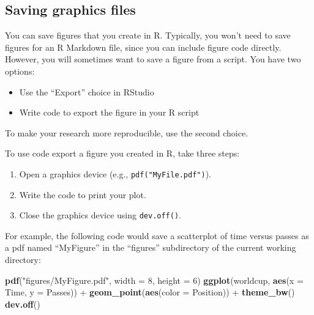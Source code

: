\documentclass[]{book}
\makeatletter
\newenvironment{Shaded}{\begin{snugshade}}{\end{snugshade}}
\newcommand{\KeywordTok}[1]{\textcolor[rgb]{0.13,0.29,0.53}{\textbf{{#1}}}}
\newcommand{\DataTypeTok}[1]{\textcolor[rgb]{0.13,0.29,0.53}{{#1}}}
\newcommand{\DecValTok}[1]{\textcolor[rgb]{0.00,0.00,0.81}{{#1}}}
\newcommand{\StringTok}[1]{\textcolor[rgb]{0.31,0.60,0.02}{{#1}}}
\newcommand{\NormalTok}[1]{{#1}}
\providecommand{\tightlist}{%
  \setlength{\itemsep}{0pt}\setlength{\parskip}{0pt}}
\newenvironment{kframe}{%
\medskip{}
\setlength{\fboxsep}{.8em}
 \def\at@end@of@kframe{}%
 \ifinner\ifhmode%
  \def\at@end@of@kframe{\end{minipage}}%
  \begin{minipage}{\columnwidth}%
 \fi\fi%
 \def\FrameCommand##1{\hskip\@totalleftmargin \hskip-\fboxsep
 \colorbox{shadecolor}{##1}\hskip-\fboxsep
     \hskip-\linewidth \hskip-\@totalleftmargin \hskip\columnwidth}%
 \MakeFramed {\advance\hsize-\width
   \@totalleftmargin\z@ \linewidth\hsize
   \@setminipage}}%
 {\par\unskip\endMakeFramed%
 \at@end@of@kframe}
\renewenvironment{Shaded}{\begin{kframe}}{\end{kframe}}
\makeatother
\begin{document}
\subsection{Saving graphics files}\label{saving-graphics-files}

You can save figures that you create in R. Typically, you won't need to
save figures for an R Markdown file, since you can include figure code
directly. However, you will sometimes want to save a figure from a
script. You have two options:

\begin{itemize}
\tightlist
\item
  Use the ``Export'' choice in RStudio
\item
  Write code to export the figure in your R script
\end{itemize}

To make your research more reproducible, use the second choice.

To use code export a figure you created in R, take three steps:

\begin{enumerate}
\def\labelenumi{\arabic{enumi}.}
\tightlist
\item
  Open a graphics device (e.g., \texttt{pdf("MyFile.pdf")}).
\item
  Write the code to print your plot.
\item
  Close the graphics device using \texttt{dev.off()}.
\end{enumerate}

For example, the following code would save a scatterplot of time versus
passes as a pdf named ``MyFigure'' in the ``figures'' subdirectory of
the current working directory:

\begin{Shaded}
\begin{Highlighting}[]
\KeywordTok{pdf}\NormalTok{(}\StringTok{"figures/MyFigure.pdf"}\NormalTok{, }\DataTypeTok{width =} \DecValTok{8}\NormalTok{, }\DataTypeTok{height =} \DecValTok{6}\NormalTok{)}
\KeywordTok{ggplot}\NormalTok{(worldcup, }\KeywordTok{aes}\NormalTok{(}\DataTypeTok{x =} \NormalTok{Time, }\DataTypeTok{y =} \NormalTok{Passes)) +}\StringTok{ }
\StringTok{        }\KeywordTok{geom_point}\NormalTok{(}\KeywordTok{aes}\NormalTok{(}\DataTypeTok{color =} \NormalTok{Position)) +}\StringTok{ }
\StringTok{        }\KeywordTok{theme_bw}\NormalTok{()}
\KeywordTok{dev.off}\NormalTok{()}
\end{Highlighting}
\end{Shaded}
\end{document}
